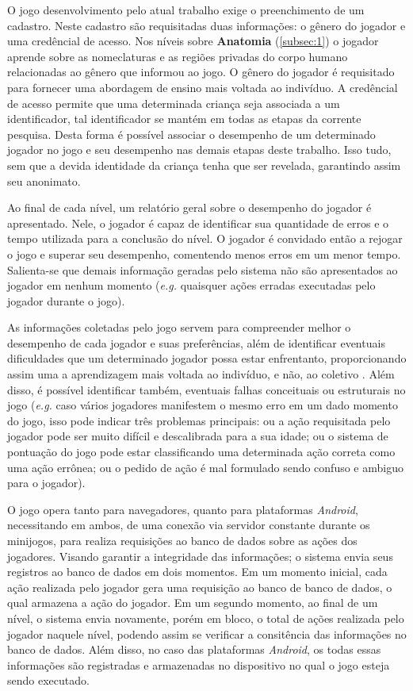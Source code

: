 O jogo desenvolvimento pelo atual trabalho exige o preenchimento de um cadastro. Neste cadastro são requisitadas duas informações: o gênero do jogador e uma credêncial de acesso. Nos níveis sobre \textbf{Anatomia} (\autoref{subsec:1}) o jogador aprende sobre as nomeclaturas e as regiões privadas do corpo humano relacionadas ao gênero que informou ao jogo. O gênero do jogador é requisitado para fornecer uma abordagem de ensino mais voltada ao indivíduo. A credêncial de acesso permite que uma determinada criança seja associada a um identificador, tal identificador se mantém em todas as etapas da corrente pesquisa. Desta forma é possível associar o desempenho de um determinado jogador no jogo e seu desempenho nas demais etapas deste trabalho. Isso tudo, sem que a devida identidade da criança tenha que ser revelada, garantindo assim seu anonimato. 

Ao final de cada nível, um relatório geral sobre o desempenho do jogador é apresentado. Nele, o jogador é capaz de identificar sua quantidade de erros e o tempo utilizada para a conclusão do nível. O jogador é convidado então a rejogar o jogo e superar seu desempenho, comentendo menos erros em um menor tempo. Salienta-se que demais informação geradas pelo sistema não são apresentados ao jogador em nenhum momento (\textit{e.g.} quaisquer ações erradas executadas pelo jogador durante o jogo). 

As informações coletadas pelo jogo servem para compreender melhor o desempenho de cada jogador e suas preferências, além de identificar eventuais dificuldades que um determinado jogador possa estar enfrentanto, proporcionando assim uma a aprendizagem mais voltada ao indivíduo, e não, ao coletivo \cite{carrara2018criancca}. Além disso, é possível identificar também, eventuais falhas conceituais ou estruturais no jogo (\textit{e.g.} caso vários jogadores manifestem o mesmo erro em um dado momento do jogo, isso pode indicar três problemas principais: ou a ação requisitada pelo jogador pode ser muito difícil e descalibrada para a sua idade; ou o sistema de pontuação do jogo pode estar classificando uma determinada ação correta como uma ação errônea; ou o pedido de ação é mal formulado sendo confuso e ambiguo para o jogador).

O jogo opera tanto para navegadores, quanto para plataformas \textit{Android}, necessitando em ambos, de  uma conexão via servidor constante durante os minijogos, para realiza requisições ao banco de dados sobre as ações dos jogadores. Visando garantir a integridade das informações; o sistema envia seus registros ao banco de dados em dois momentos. Em um momento inicial, cada ação realizada pelo jogador gera uma requisição ao banco de banco de dados, o qual armazena a ação do jogador. Em um segundo momento, ao final de um nível, o sistema envia novamente, porém em bloco, o total de ações realizada pelo jogador naquele nível, podendo assim se verificar a consitência das informações no banco de dados. Além disso, no caso das plataformas \textit{Android}, os todas essas informações são registradas e armazenadas no dispositivo no qual o jogo esteja sendo executado.


